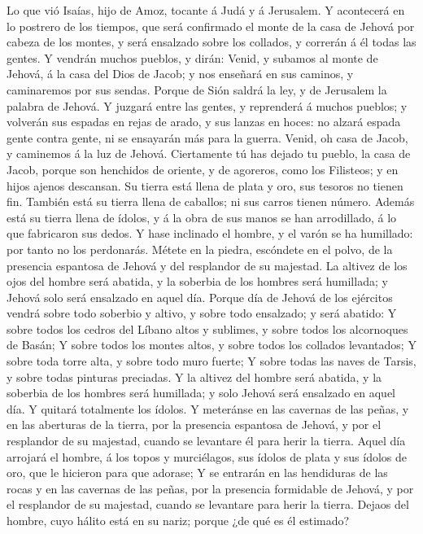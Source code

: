  Lo que vió Isaías, hijo de Amoz, tocante á Judá y á
Jerusalem.  Y acontecerá en lo postrero de los tiempos, que
será confirmado el monte de la casa de Jehová por cabeza de los montes,
y será ensalzado sobre los collados, y correrán á él todas las gentes.
 Y vendrán muchos pueblos, y dirán: Venid, y subamos al
monte de Jehová, á la casa del Dios de Jacob; y nos enseñará en sus
caminos, y caminaremos por sus sendas. Porque de Sión saldrá la ley, y
de Jerusalem la palabra de Jehová.  Y juzgará entre las
gentes, y reprenderá á muchos pueblos; y volverán sus espadas en rejas
de arado, y sus lanzas en hoces: no alzará espada gente contra gente, ni
se ensayarán más para la guerra.  Venid, oh casa de Jacob, y
caminemos á la luz de Jehová.  Ciertamente tú has dejado tu
pueblo, la casa de Jacob, porque son henchidos de oriente, y de
agoreros, como los Filisteos; y en hijos ajenos descansan. 
Su tierra está llena de plata y oro, sus tesoros no tienen fin. También
está su tierra llena de caballos; ni sus carros tienen número.
 Además está su tierra llena de ídolos, y á la obra de sus
manos se han arrodillado, á lo que fabricaron sus dedos.  Y
hase inclinado el hombre, y el varón se ha humillado: por tanto no los
perdonarás.  Métete en la piedra, escóndete en el polvo, de
la presencia espantosa de Jehová y del resplandor de su majestad.
 La altivez de los ojos del hombre será abatida, y la
soberbia de los hombres será humillada; y Jehová solo será ensalzado en
aquel día.  Porque día de Jehová de los ejércitos vendrá
sobre todo soberbio y altivo, y sobre todo ensalzado; y será abatido:
 Y sobre todos los cedros del Líbano altos y sublimes, y
sobre todos los alcornoques de Basán;  Y sobre todos los
montes altos, y sobre todos los collados levantados;  Y
sobre toda torre alta, y sobre todo muro fuerte;  Y sobre
todas las naves de Tarsis, y sobre todas pinturas preciadas.
 Y la altivez del hombre será abatida, y la soberbia de los
hombres será humillada; y solo Jehová será ensalzado en aquel día.
 Y quitará totalmente los ídolos.  Y meteránse
en las cavernas de las peñas, y en las aberturas de la tierra, por la
presencia espantosa de Jehová, y por el resplandor de su majestad,
cuando se levantare él para herir la tierra.  Aquel día
arrojará el hombre, á los topos y murciélagos, sus ídolos de plata y sus
ídolos de oro, que le hicieron para que adorase;  Y se
entrarán en las hendiduras de las rocas y en las cavernas de las peñas,
por la presencia formidable de Jehová, y por el resplandor de su
majestad, cuando se levantare para herir la tierra.  Dejaos
del hombre, cuyo hálito está en su nariz; porque ¿de qué es él estimado?

